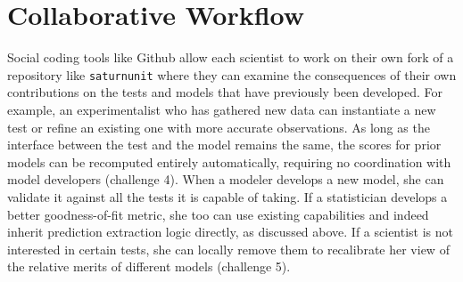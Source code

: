 \documentclass[9pt]{sig-alternate}
\newcommand{\verbx}[1]{\lstinline{#1}}
\begin{document}
%    
%
%
\section{Collaborative Workflow}\label{scidash}

Social coding tools like Github allow each scientist to work on their own fork of a repository like \verbx{saturnunit} where they can examine the consequences of their own contributions on  the tests and models that have previously been developed. For example, an experimentalist who has gathered new data can instantiate a new test or refine an existing one  with more accurate observations. As long as the interface between the test and the model remains the same, the scores for prior models can be recomputed entirely automatically, requiring no coordination with model developers (challenge 4). When a modeler develops a new model, she can   validate it against all the tests it is capable of taking. If a statistician develops a better goodness-of-fit metric, she too can use existing capabilities and indeed inherit prediction extraction logic directly, as discussed above. If a scientist is not interested in certain tests, she can locally remove them to recalibrate her view of the relative merits of different models (challenge 5). 
\end{document}

